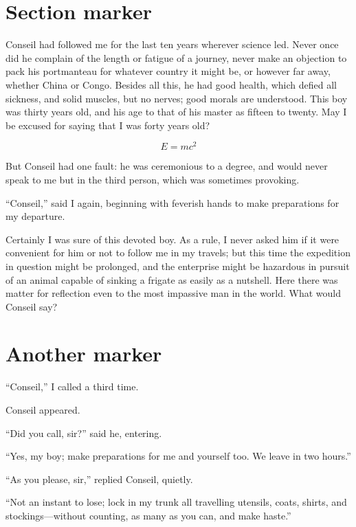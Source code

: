 \section{Section marker}

Conseil had followed me for the last ten years wherever science led.
Never once did he complain of the length or fatigue of a journey,
never make an objection to pack his portmanteau for whatever
country it might be, or however far away, whether China or Congo.
Besides all this, he had good health, which defied all sickness,
and solid muscles, but no nerves; good morals are understood.
This boy was thirty years old, and his age to that of his master
as fifteen to twenty.  May I be excused for saying that I was
forty years old?

\begin{equation}
E=mc^2
\end{equation}

But Conseil had one fault:  he was ceremonious to a degree,
and would never speak to me but in the third person,
which was sometimes provoking.

``Conseil,'' said I again, beginning with feverish hands to make
preparations for my departure.

Certainly I was sure of this devoted boy.  As a rule, I never asked
him if it were convenient for him or not to follow me in my travels;
but this time the expedition in question might be prolonged,
and the enterprise might be hazardous in pursuit of an animal capable
of sinking a frigate as easily as a nutshell.  Here there was matter
for reflection even to the most impassive man in the world.
What would Conseil say?

\section{Another marker}

``Conseil,'' I called a third time.

Conseil appeared.

``Did you call, sir?'' said he, entering.

``Yes, my boy; make preparations for me and yourself too.
We leave in two hours.''

``As you please, sir,'' replied Conseil, quietly.

``Not an instant to lose; lock in my trunk all travelling utensils,
coats, shirts, and stockings---without counting, as many as you can,
and make haste.''

